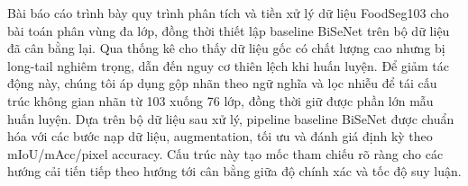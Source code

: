 Bài báo cáo trình bày quy trình phân tích và tiền xử lý dữ liệu FoodSeg103 cho bài toán phân vùng đa lớp, đồng thời thiết lập baseline BiSeNet trên bộ dữ liệu đã cân bằng lại. Qua thống kê cho thấy dữ liệu gốc có chất lượng cao nhưng bị long-tail nghiêm trọng, dẫn đến nguy cơ thiên lệch khi huấn luyện. Để giảm tác động này, chúng tôi áp dụng gộp nhãn theo ngữ nghĩa và lọc nhiễu để tái cấu trúc không gian nhãn từ 103 xuống 76 lớp, đồng thời giữ được phần lớn mẫu huấn luyện. Dựa trên bộ dữ liệu sau xử lý, pipeline baseline BiSeNet được chuẩn hóa với các bước nạp dữ liệu, augmentation, tối ưu và đánh giá định kỳ theo mIoU/mAcc/pixel accuracy. Cấu trúc này tạo mốc tham chiếu rõ ràng cho các hướng cải tiến tiếp theo hướng tới cân bằng giữa độ chính xác và tốc độ suy luận.